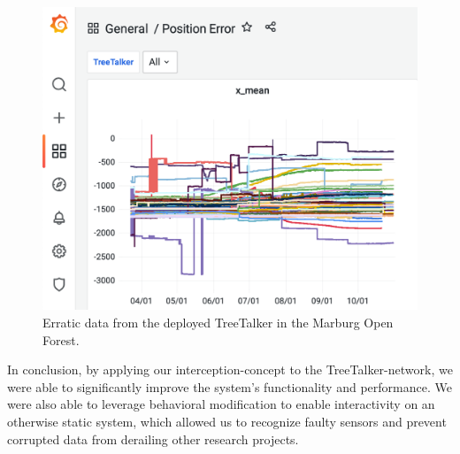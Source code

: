 \begin{figure}
    \centering
    \includegraphics[width=\linewidth]{figures/TTT_position_data_smallest.png}
    \caption{Erratic data from the deployed TreeTalker in the Marburg Open Forest.}
    \label{fig:ttt_position_error}
\end{figure}

In conclusion, by applying our interception-concept to the TreeTalker-network, we were able to significantly improve the system's functionality and performance.
We were also able to leverage behavioral modification to enable interactivity on an otherwise static system, which allowed us to recognize faulty sensors and prevent corrupted data from derailing other research projects.
